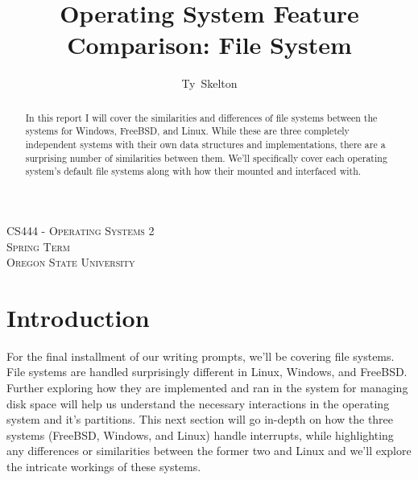 \documentclass[10pt,draftclsnofoot,onecolumn]{IEEEtran}
\begin{document}
\singlespacing %
\title{Operating System Feature Comparison: File System}

\author{Ty~Skelton}

\maketitle

\begin{abstract} %
In this report I will cover the similarities and differences of file systems between the systems for Windows, FreeBSD, and Linux.
While these are three completely independent systems with their own data structures and implementations, there are a surprising number of similarities between them.
We'll specifically cover each operating system's default file systems along with how their mounted and interfaced with.
\end{abstract}

\begin{center}
\scshape %
CS444 - Operating Systems 2 \\  %
Spring Term\\[\baselineskip]    %
Oregon State University\par     %
\end{center}

\IEEEpeerreviewmaketitle

\newpage
{}
\tableofcontents
\newpage

\section{Introduction}
\label{sec:Introduction}
\par For the final installment of our writing prompts, we'll be covering file systems.
File systems are handled surprisingly different in Linux, Windows, and FreeBSD.
Further exploring how they are implemented and ran in the system for managing disk space will help us understand the necessary interactions in the operating system and it's partitions.
This next section will go in-depth on how the three systems (FreeBSD, Windows, and Linux) handle interrupts, while highlighting any differences or similarities between the former two and Linux and we'll explore the intricate workings of these systems.
\end{document}
